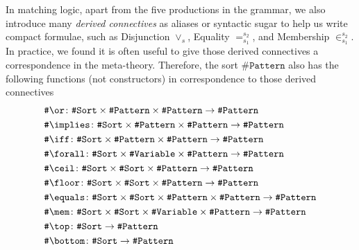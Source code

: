 \documentclass[UTF8,11pt]{article}
\theoremstyle{plain}
\theoremstyle{definition}
\theoremstyle{remark}
\newcommand{\sharpsymbol}{\#}
\newcommand{\KSort}{\texttt{\sharpsymbol Sort}}
\newcommand{\KVariable}{\texttt{\sharpsymbol Variable}}
\newcommand{\KPattern}{\texttt{\sharpsymbol Pattern}}
\newcommand{\Kor}{\texttt{\sharpsymbol \slashsymbol  or}}
\newcommand{\Kimplies}{\texttt{\sharpsymbol  \slashsymbol implies}}
\newcommand{\Kiff}{\texttt{\sharpsymbol  \slashsymbol iff}}
\newcommand{\Kforall}{\texttt{\sharpsymbol \slashsymbol  forall}}
\newcommand{\Kequals}{\texttt{\sharpsymbol \slashsymbol  equals}}
\newcommand{\Kmembership}{\texttt{\sharpsymbol \slashsymbol  mem}}
\newcommand{\Ktop}{\texttt{\sharpsymbol \slashsymbol  top}}
\newcommand{\Kbottom}{\texttt{\sharpsymbol \slashsymbol  bottom}}
\newcommand{\Kfloor}{\texttt{\sharpsymbol \slashsymbol  floor}}
\newcommand{\Kceil}{\texttt{\sharpsymbol \slashsymbol  ceil}}
\newcommand{\slashsymbol}{\symbol{92}}
\begin{document}
In matching logic, apart from the five productions in the grammar, we also 
introduce many \emph{derived connectives} as aliases or syntactic sugar to help 
us write compact formulae, such as Disjunction $\vee_s$, Equality 
$=_{s_1}^{s_2}$, and Membership $\in_{s_1}^{s_2}$.
In practice, we found it is often useful to give those derived connectives a 
correspondence in the meta-theory. Therefore, the sort $\KPattern$ also has
the following functions (not constructors) in correspondence to those derived 
connectives
\begin{align*}
  & \Kor \colon \KSort\times\KPattern \times \KPattern   \to \KPattern
  \\
  & \Kimplies \colon \KSort\times\KPattern \times \KPattern   \to \KPattern
  \\
  & \Kiff \colon \KSort\times\KPattern \times \KPattern   \to \KPattern
  \\
  & \Kforall \colon \KSort\times\KVariable \times \KPattern   \to \KPattern
  \\
  & \Kceil \colon \KSort\times\KSort\times\KPattern     \to \KPattern
  \\
  & \Kfloor \colon \KSort\times\KSort\times\KPattern     \to \KPattern
  \\
  & \Kequals \colon \KSort\times\KSort \times \KPattern \times \KPattern \to 
  \KPattern
  \\
  & \Kmembership \colon \KSort \times \KSort \times \KVariable \times 
  \KPattern  \to \KPattern
  \\
  & \Ktop \colon \KSort \to \KPattern
  \\
  & \Kbottom \colon \KSort \to \KPattern
\end{align*}
\end{document}
